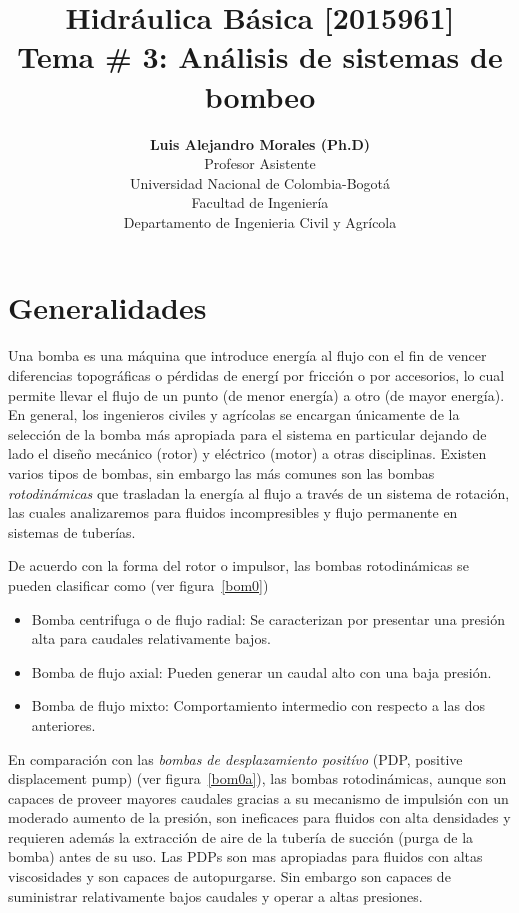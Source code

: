 \documentclass[11pt, oneside]{article}
\title{Hidr\'aulica B\'asica [2015961] \\ \textbf{Tema \# 3: An\'alisis de sistemas de bombeo}}
\author{\textbf{Luis Alejandro Morales (Ph.D)}\\ \vspace{0.4cm} Profesor Asistente \\ Universidad Nacional de Colombia-Bogot\'a\\Facultad de Ingenier\'ia \\ Departamento de Ingenieria Civil y Agr\'icola}
\date{}
\begin{document}
\maketitle
\tableofcontents



\section{Generalidades}
Una bomba es una m\'aquina que introduce energ\'ia al flujo con el fin de vencer diferencias topogr\'aficas o p\'erdidas de energ\'i por fricci\'on o por accesorios, lo cual permite llevar el flujo de un punto (de menor energ\'ia) a otro (de mayor energ\'ia). En general, los ingenieros civiles y agr\'icolas se encargan \'unicamente de la selecci\'on de la bomba m\'as apropiada para el sistema en particular dejando de lado el dise\~no mec\'anico (rotor) y el\'ectrico (motor) a otras disciplinas. Existen varios tipos de bombas, sin embargo las m\'as comunes son las bombas \emph{rotodin\'amicas} que trasladan la energ\'ia al flujo a trav\'es de un sistema de rotaci\'on, las cuales analizaremos para fluidos incompresibles y flujo permanente en sistemas de tuber\'ias.

De acuerdo con la forma del rotor o impulsor, las bombas rotodin\'amicas se pueden clasificar como (ver figura~\ref{bom0})
\begin{itemize}
\item Bomba centrifuga o de flujo radial: Se caracterizan por presentar una presi\'on alta para caudales relativamente bajos.
\item Bomba de flujo axial: Pueden generar un caudal alto con una baja presi\'on.
\item Bomba de flujo mixto: Comportamiento intermedio con respecto a las dos anteriores.
\end{itemize}

En comparaci\'on con las \emph{bombas de desplazamiento posit\'ivo} (PDP, positive displacement pump) (ver figura~\ref{bom0a}), las bombas rotodin\'amicas, aunque son capaces de proveer mayores caudales gracias a su mecanismo de impulsi\'on con un moderado aumento de la presi\'on, son ineficaces para fluidos con alta densidades y requieren adem\'as la extracci\'on de aire de la tuber\'ia de succi\'on (purga de la bomba) antes de su uso. Las PDPs son mas apropiadas para fluidos con altas viscosidades y son capaces de autopurgarse. Sin embargo son capaces de suministrar relativamente bajos caudales y operar a altas presiones. 
\end{document}
